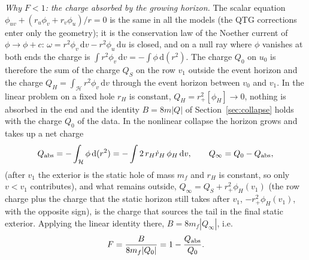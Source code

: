 \documentclass[11pt]{article}
\begin{document}
\emph{Why $F<1$: the charge absorbed by the growing horizon.} The scalar equation $\phi_{uv}+(r_u\phi_v+r_v\phi_u)/r=0$ is the same in all the models (the QTG corrections enter only the geometry); it is the conservation law of the Noether current of $\phi\to\phi+c$: $\omega=r^{2}\phi_v\,\mathrm dv-r^{2}\phi_u\,\mathrm du$ is closed, and on a null ray where $\phi$ vanishes at both ends the charge is $\int r^{2}\phi_v\,\mathrm dv=-\int\phi\,\mathrm d(r^{2})$. The charge $Q_0$ on $u_0$ is therefore the sum of the charge $Q_S$ on the row $v_1$ outside the event horizon and the charge $Q_H=\int_{\mathcal H}r^{2}\phi_v\,\mathrm dv$ through the event horizon between $v_0$ and $v_1$. In the linear problem on a fixed hole $r_H$ is constant, $Q_H=r_+^{2}[\phi_H]\to0$, nothing is absorbed in the end and the identity $B=8m|Q|$ of Section~\ref{sec:collapse} holds with the charge $Q_0$ of the data. In the nonlinear collapse the horizon grows and takes up a net charge
\begin{equation}Q_{\rm abs}=-\int_{\mathcal H}\phi\,\mathrm d(r^{2})=-\int 2\,r_H\dot r_H\,\phi_H\,\mathrm dv,\qquad Q_\infty=Q_0-Q_{\rm abs},\label{eq:qabs}\end{equation}
(after $v_1$ the exterior is the static hole of mass $m_f$ and $r_H$ is constant, so only $v<v_1$ contributes), and what remains outside, $Q_\infty=Q_S+r_+^{2}\phi_H(v_1)$ (the row charge plus the charge that the static horizon still takes after $v_1$, $-r_+^{2}\phi_H(v_1)$, with the opposite sign), is the charge that sources the tail in the final static exterior. Applying the linear identity there, $B=8m_f|Q_\infty|$, i.e.
\begin{equation}F=\frac{B}{8m_f|Q_0|}=1-\frac{Q_{\rm abs}}{Q_0}.\label{eq:Fabs}\end{equation}
\end{document}
